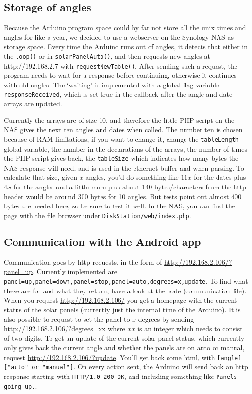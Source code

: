 		\subsection{Storage of angles}\label{subsec:storageOfAngles}
			Because the Arduino program space could by far not store all the unix times and angles for like a year, we decided to use a webserver on the Synology NAS as storage space.
			Every time the Arduino runs out of angles, it detects that either in the \verb|loop()| or in \verb|solarPanelAuto()|, and then requests new angles at \url{http://192.168.2.7} with \verb|requestNewTable()|. After sending such a request, the program needs to wait for a response before continuing, otherwise it continues with old angles.
			The `waiting' is implemented with a global flag variable \verb|responseReceived|, which is set true in the callback after the angle and date arrays are updated.

			Currently the arrays are of size 10, and therefore the little PHP script on the NAS gives the next ten angles and dates when called.
			The number ten is chosen because of RAM limitations, if you want to change it, change the \verb|tableLength| global variable, the number in the declarations of the arrays, the number of times the PHP script gives back, the \verb|tableSize| which indicates how many bytes the NAS response will need, and is used in the ethernet buffer and when parsing.
			To calculate that size, given $x$ angles, you'd do something like $11x$ for the dates plus $4x$ for the angles and a little more plus about 140 bytes/characters from the http header would be around 300 bytes for 10 angles.
			But tests point out almost 400 bytes are needed here, so be sure to test it well.
			In the NAS, you can find the page with the file browser under \verb|DiskStation/web/index.php|.

		\subsection{Communication with the Android app} \label{subsec:arduinotoandroid}
			Communication goes by http requests, in the form of \url{http://192.168.2.106/?panel=up}.
			Currently implemented are \verb|panel=up,panel=down,panel=stop,panel=auto,degrees=x,update|.
			To find what these are for and what they return, have a look at the code (communication file).
			When you request \url{http://192.168.2.106/} you get a homepage with the current status of the solar panels (currently just the internal time of the Arduino).
			It is also possible to request to set the panel to $x$ degrees by sending \url{http://192.168.2.106/?degrees=xx} where $xx$ is an integer which needs to consist of two digits.
			To get an update of the current solar panel status, which currently only gives back the current angle and whether the panels are on auto or manual, request \url{http://192.168.2.106/?update}.
			You'll get back some html, with \verb|[angle] ["auto" or "manual"]|.
			On every action sent, the Arduino will send back an http response starting with \verb|HTTP/1.0 200 OK|, and including something like \verb|Panels going up.|.
